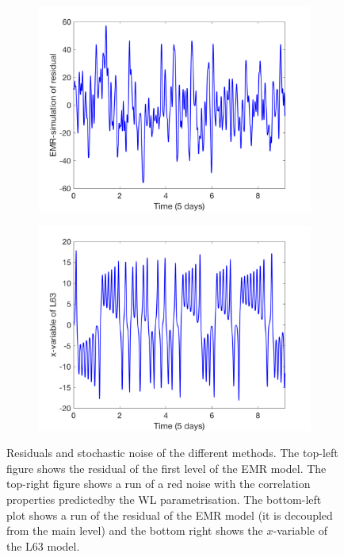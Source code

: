 \documentclass[12pt]{article}
\begin{document}
\begin{figure}[H]
\begin{subfigure}[b]{0.49\textwidth}
		\includegraphics[width=\textwidth]{plots/l84l63/emr_residuals_sim.png}
	\end{subfigure}
	\hfill
	\begin{subfigure}[b]{0.49\textwidth}
		\centering
		\includegraphics[width=\textwidth]{plots/l84l63/xl63.png}
	\end{subfigure}
	\caption{\label{residuals} Residuals and stochastic noise of the different methods. The top-left figure shows the residual of the first level of the EMR model. The top-right figure shows a run of a red noise with the correlation properties predictedby the WL parametrisation. The bottom-left plot shows a run of the residual of the EMR model (it is decoupled from the main level) and the bottom right shows the $x$-variable of the L63 model.}
\end{figure}
\end{document}

